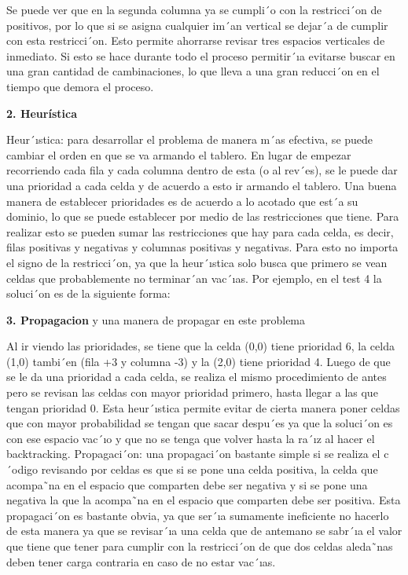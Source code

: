 \documentclass[12pt]{article}
\begin{document}
Se puede ver que en la segunda columna ya se cumpli´o con la restricci´on de positivos, por lo que si se
asigna cualquier im´an vertical se dejar´a de cumplir con esta restricci´on. Esto permite ahorrarse revisar tres
espacios verticales de inmediato. Si esto se hace durante todo el proceso permitir´ıa evitarse buscar en una
gran cantidad de cambinaciones, lo que lleva a una gran reducci´on en el tiempo que demora el proceso.



\textbf{2. Heurística}

Heur´ıstica: para desarrollar el problema de manera m´as efectiva, se puede cambiar el orden en que se
va armando el tablero. En lugar de empezar recorriendo cada fila y cada columna dentro de esta (o al rev´es),
se le puede dar una prioridad a cada celda y de acuerdo a esto ir armando el tablero. Una buena manera
de establecer prioridades es de acuerdo a lo acotado que est´a su dominio, lo que se puede establecer por
medio de las restricciones que tiene. Para realizar esto se pueden sumar las restricciones que hay para cada
celda, es decir, filas positivas y negativas y columnas positivas y negativas. Para esto no importa el signo de
la restricci´on, ya que la heur´ıstica solo busca que primero se vean celdas que probablemente no terminar´an
vac´ıas. Por ejemplo, en el test 4 la soluci´on es de la siguiente forma:



\textbf{3. Propagacion}
y una manera de propagar en este problema 


Al ir viendo las prioridades, se tiene que la celda (0,0) tiene prioridad 6, la celda (1,0) tambi´en (fila +3 y
columna -3) y la (2,0) tiene prioridad 4. Luego de que se le da una prioridad a cada celda, se realiza el mismo
procedimiento de antes pero se revisan las celdas con mayor prioridad primero, hasta llegar a las que tengan
prioridad 0. Esta heur´ıstica permite evitar de cierta manera poner celdas que con mayor probabilidad se
tengan que sacar despu´es ya que la soluci´on es con ese espacio vac´ıo y que no se tenga que volver hasta la
ra´ız al hacer el backtracking.
Propagaci´on: una propagaci´on bastante simple si se realiza el c´odigo revisando por celdas es que si se
pone una celda positiva, la celda que acompa˜na en el espacio que comparten debe ser negativa y si se pone
una negativa la que la acompa˜na en el espacio que comparten debe ser positiva. Esta propagaci´on es bastante
obvia, ya que ser´ıa sumamente ineficiente no hacerlo de esta manera ya que se revisar´ıa una celda que de
antemano se sabr´ıa el valor que tiene que tener para cumplir con la restricci´on de que dos celdas aleda˜nas
deben tener carga contraria en caso de no estar vac´ıas.









\end{document}
